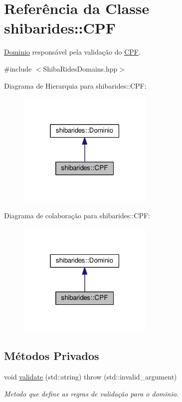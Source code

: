 \hypertarget{classshibarides_1_1CPF}{}\section{Referência da Classe shibarides\+:\+:C\+PF}
\label{classshibarides_1_1CPF}


\hyperlink{classshibarides_1_1Dominio}{Dominio} responsável pela validação do \hyperlink{classshibarides_1_1CPF}{C\+PF}.  




{\ttfamily \#include $<$Shiba\+Rides\+Domains.\+hpp$>$}



Diagrama de Hierarquia para shibarides\+:\+:C\+PF\+:\nopagebreak
\begin{figure}[H]
\begin{center}
\leavevmode
\includegraphics[width=183pt]{classshibarides_1_1CPF__inherit__graph}
\end{center}
\end{figure}


Diagrama de colaboração para shibarides\+:\+:C\+PF\+:\nopagebreak
\begin{figure}[H]
\begin{center}
\leavevmode
\includegraphics[width=183pt]{classshibarides_1_1CPF__coll__graph}
\end{center}
\end{figure}
\subsection*{Métodos Privados}
\begin{DoxyCompactItemize}
\item 
void \hyperlink{classshibarides_1_1CPF_a0764894456e73dde8130a07f95b68f08}{validate} (std\+::string)  throw (std\+::invalid\+\_\+argument)
\begin{DoxyCompactList}\small\item\em Metodo que define as regras de validação para o dominio. \end{DoxyCompactList}\end{DoxyCompactItemize}
